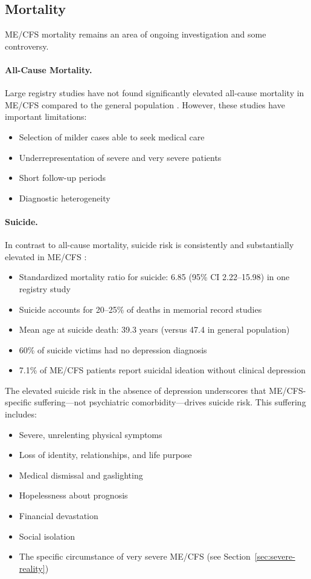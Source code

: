 \subsection{Mortality}

ME/CFS mortality remains an area of ongoing investigation and some controversy.

\paragraph{All-Cause Mortality.}
Large registry studies have not found significantly elevated all-cause mortality in ME/CFS compared to the general population \cite{Roberts2016, GenRe2023}. However, these studies have important limitations:
\begin{itemize}
    \item Selection of milder cases able to seek medical care
    \item Underrepresentation of severe and very severe patients
    \item Short follow-up periods
    \item Diagnostic heterogeneity
\end{itemize}

\paragraph{Suicide.}
In contrast to all-cause mortality, suicide risk is consistently and substantially elevated in ME/CFS \cite{Roberts2016, McManimen2016, Chu2021suicide}:
\begin{itemize}
    \item Standardized mortality ratio for suicide: 6.85 (95\% CI 2.22--15.98) in one registry study
    \item Suicide accounts for 20--25\% of deaths in memorial record studies
    \item Mean age at suicide death: 39.3 years (versus 47.4 in general population)
    \item 60\% of suicide victims had no depression diagnosis
    \item 7.1\% of ME/CFS patients report suicidal ideation without clinical depression
\end{itemize}

The elevated suicide risk in the absence of depression underscores that ME/CFS-specific suffering---not psychiatric comorbidity---drives suicide risk. This suffering includes:
\begin{itemize}
    \item Severe, unrelenting physical symptoms
    \item Loss of identity, relationships, and life purpose
    \item Medical dismissal and gaslighting
    \item Hopelessness about prognosis
    \item Financial devastation
    \item Social isolation
    \item The specific circumstance of very severe ME/CFS (see Section~\ref{sec:severe-reality})
\end{itemize}

